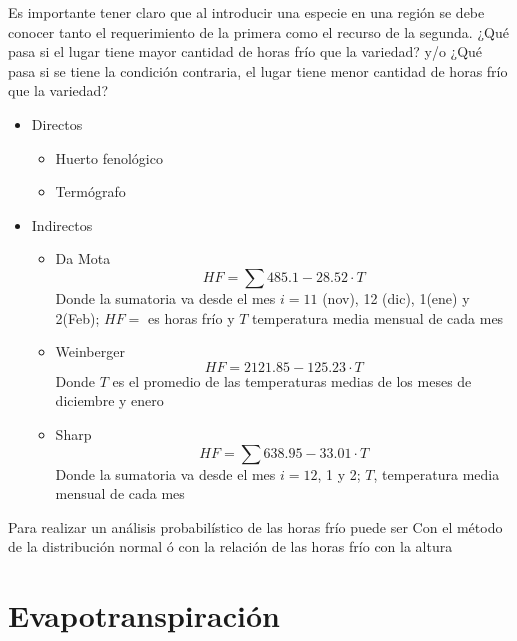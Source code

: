         Es importante tener claro que al introducir una especie en una región se debe conocer tanto el requerimiento de la primera como el recurso de la segunda. ¿Qué pasa si el lugar tiene mayor cantidad de horas frío que la variedad? y/o ¿Qué pasa si se tiene la condición contraria, el lugar tiene menor cantidad de horas frío que la variedad?
        \begin{itemize}
            \item Directos \begin{itemize}
                \item Huerto fenológico
                \item Termógrafo
            \end{itemize}
            \item Indirectos \begin{itemize}
                \item Da Mota
                \begin{equation}
                    HF = \sum 485.1 - 28.52\cdot T
                \end{equation}
                Donde la sumatoria va desde el mes $i = 11$ (nov), 12 (dic), 1(ene) y 2(Feb); $HF=$ es horas frío y $T$ temperatura media mensual de cada mes
                \item Weinberger
                \begin{equation}
                    HF = 2121.85 -125.23\cdot T
                \end{equation}
                Donde $T$ es el promedio de las temperaturas medias de los meses de diciembre y enero
                \item Sharp
                \begin{equation}
                    HF = \sum 638.95 - 33.01\cdot T
                \end{equation}
                Donde la sumatoria va desde el mes $i = 12$, 1 y 2; $T$, temperatura media mensual de cada mes
            \end{itemize}
        \end{itemize}
        Para realizar un análisis probabilístico de las horas frío puede ser Con el método de la distribución normal ó con la relación de las horas frío con la altura
        \section{Evapotranspiración}

